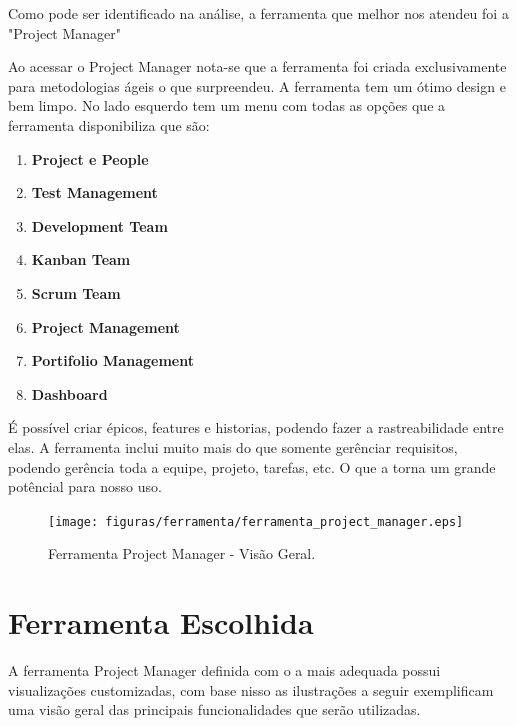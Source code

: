   Como pode ser identificado na análise, a ferramenta que melhor nos atendeu foi a "Project Manager"

  Ao acessar o Project Manager nota-se que a ferramenta foi criada exclusivamente para metodologias ágeis o que surpreendeu. A ferramenta tem um ótimo design e bem limpo.
  No lado esquerdo tem um menu com todas as opções que a ferramenta disponibiliza que são:
  \begin{enumerate}
  \item \textbf{Project e People }
  \item \textbf{Test Management }
  \item \textbf{Development Team }
  \item \textbf{Kanban Team }
  \item \textbf{Scrum Team }
  \item \textbf{Project Management }
  \item \textbf{Portifolio Management }
  \item \textbf{Dashboard }
  \end{enumerate}
  É possível criar épicos, features e historias, podendo fazer a rastreabilidade entre elas.
  A ferramenta inclui muito mais do que somente gerênciar requisitos, podendo gerência toda a equipe, projeto, tarefas, etc. O que a torna um grande potêncial para nosso uso.

  \begin{figure}[H]
    \centering
  \texttt{[image: figuras/ferramenta/ferramenta\_project\_manager.eps]}
    \caption{Ferramenta Project Manager - Visão Geral.}
    \label{fig:progama}
  \end{figure}


\section{Ferramenta Escolhida}

  A ferramenta Project Manager definida com o a mais adequada possui visualizações customizadas, com base nisso
  as ilustrações a seguir exemplificam uma visão geral das principais funcionalidades que serão utilizadas.


